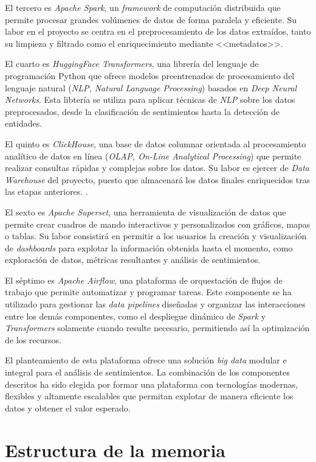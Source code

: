 El tercero es \textit{Apache Spark}, un \textit{framework} de computación distribuida que permite procesar grandes volúmenes de datos de forma paralela y eficiente. Su labor en el proyecto se centra en el preprocesamiento de los datos extraídos, tanto su limpieza y filtrado como el enriquecimiento mediante <<metadatos>>.

El cuarto es \textit{HuggingFace Transformers}, una librería del lenguaje de programación Python que ofrece modelos preentrenados de procesamiento del lenguaje natural (\textit{NLP, Natural Language Processing}) basados en \textit{Deep Neural Networks}. Esta libtería se utiliza para aplicar técnicas de \textit{NLP} sobre los datos preprocesados, desde la clasificación de sentimientos hasta la detección de entidades. 

El quinto es \textit{ClickHouse}, una base de datos columnar orientada al procesamiento analítico de datos en línea (\textit{OLAP, On-Line Analytical Processing}) que permite realizar consultas rápidas y complejas sobre los datos. Su labor es ejercer de \textit{Data Warehouse} del proyecto, puesto que almacenará los datos finales enriquecidos tras las etapas anteriores. .

El sexto es \textit{Apache Superset}, una herramienta de visualización de datos que permite crear cuadros de mando interactivos y personalizados con gráficos, mapas o tablas. Su labor consistirá en permitir a los usuarios la creación y visualización de \textit{dashboards} para explotar la información obtenida hasta el momento, como exploración de datos, métricas resultantes y análisis de sentimientos.

El séptimo es \textit{Apache Airflow}, una plataforma de orquestación de flujos de trabajo que permite automatizar y programar tareas. Este componente se ha utilizado para gestionar las \textit{data pipelines} diseñadas y organizar las interacciones entre los demás componentes, como el despliegue dinámico de \textit{Spark} y \textit{Transformers} solamente cuando resulte necesario, permitiendo así la optimización de los recursos.

El planteamiento de esta plataforma ofrece una solución \textit{big data} modular e integral para el análisis de sentimientos. La combinación de los componentes descritos ha sido elegida por formar una plataforma con tecnologías modernas, flexibles y altamente escalables que permitan explotar de manera eficiente los datos y obtener el valor esperado.

\section{Estructura de la memoria}

